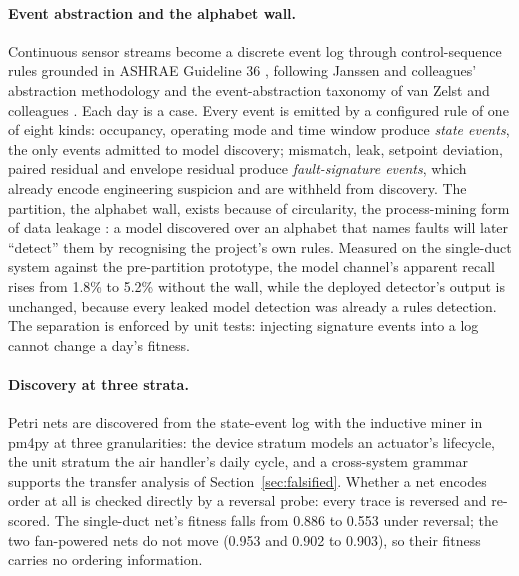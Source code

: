 \documentclass[11pt,letterpaper]{article}
\begin{document}
\paragraph{Event abstraction and the alphabet wall.} Continuous sensor streams become a discrete event log through control-sequence rules grounded in ASHRAE Guideline 36 \cite{ashrae2021guideline36}, following Janssen and colleagues' abstraction methodology \cite{janssen2021sensoreventlog} and the event-abstraction taxonomy of van Zelst and colleagues \cite{vanzelst2021eventabstraction}. Each day is a case. Every event is emitted by a configured rule of one of eight kinds: occupancy, operating mode and time window produce \emph{state events}, the only events admitted to model discovery; mismatch, leak, setpoint deviation, paired residual and envelope residual produce \emph{fault-signature events}, which already encode engineering suspicion and are withheld from discovery. The partition, the alphabet wall, exists because of circularity, the process-mining form of data leakage \cite{weytjens2022dataleakage}: a model discovered over an alphabet that names faults will later ``detect'' them by recognising the project's own rules. Measured on the single-duct system against the pre-partition prototype, the model channel's apparent recall rises from 1.8\% to 5.2\% without the wall, while the deployed detector's output is unchanged, because every leaked model detection was already a rules detection. The separation is enforced by unit tests: injecting signature events into a log cannot change a day's fitness.

\paragraph{Discovery at three strata.} Petri nets are discovered from the state-event log with the inductive miner \cite{leemans2013inductiveminer} in pm4py \cite{berti2023pm4py} at three granularities: the device stratum models an actuator's lifecycle, the unit stratum the air handler's daily cycle, and a cross-system grammar supports the transfer analysis of Section~\ref{sec:falsified}. Whether a net encodes order at all is checked directly by a reversal probe: every trace is reversed and re-scored. The single-duct net's fitness falls from 0.886 to 0.553 under reversal; the two fan-powered nets do not move (0.953 and 0.902 to 0.903), so their fitness carries no ordering information.
\end{document}
